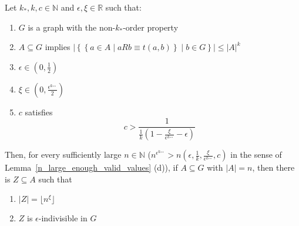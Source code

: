     \lemma[Claim 4.21]\label{many_values_to_equitative_partition_with_bound_exceptional_pairs}
        Let $k_*, k, c \in \mathbb{N}$ and $\epsilon, \xi \in \mathbb{R}$ such that:
        \begin{enumerate}
            \item\label{itm:4.21.1} $G$ is a graph with the non-$k_*$-order property
            \item\label{itm:4.21.2} $A \subseteq G$ implies $|\left\{ \left\{ a \in A \mid a R b \equiv t(a,b) \right\} \mid b \in G \right\}|
                \leq |A|^k$
            \item\label{itm:4.21.3} $\epsilon \in \left(0, \frac{1}{2}\right)$
            \item\label{itm:4.21.4} $\xi \in \left(0, \frac{\epsilon^{k_{**}}}{2} \right)$
            \item\label{itm:4.21.5} $c$ satisfies \[
                c > \frac{1}{\frac{1}{k} (1 - \frac{\xi}{\epsilon^{k_{**}}} - \epsilon)}
            \]
        \end{enumerate}
        Then, for every sufficiently large $n \in \mathbb{N}$ ($n^{\epsilon^{k_{**}}} > n\left( \epsilon, \frac{1}{k},
            \frac{\xi}{\epsilon^{k_{**}}}, c \right)$ in the sense of Lemma~\ref{n_large_enough_valid_values} (d)), if
            $A \subseteq G$ with $|A| = n$, then there is $Z \subseteq A$ such that
        \begin{enumerate}[label=(\alph*), ref=\alph*]
            \item\label{itm:4.21.a} $|Z| = \lfloor n^\xi \rfloor$
            \item\label{itm:4.21.b} $Z$ is $\epsilon$-indivisible in $G$
        \end{enumerate}
